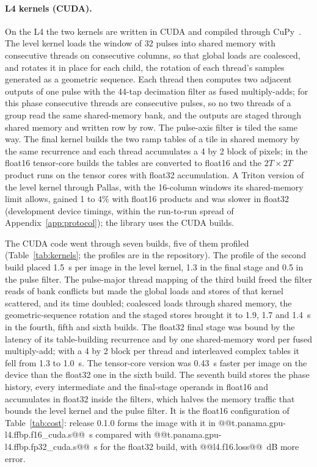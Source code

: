 \documentclass[11pt]{article}
\begin{document}
\paragraph{L4 kernels (CUDA).} On the L4 the two kernels are written in CUDA and compiled through CuPy~\cite{okuta2017}. The level kernel loads the window of 32 pulses into shared memory with consecutive threads on consecutive columns, so that global loads are coalesced, and rotates it in place for each child, the rotation of each thread's samples generated as a geometric sequence. Each thread then computes two adjacent outputs of one pulse with the 44-tap decimation filter as fused multiply-adds; for this phase consecutive threads are consecutive pulses, so no two threads of a group read the same shared-memory bank, and the outputs are staged through shared memory and written row by row. The pulse-axis filter is tiled the same way. The final kernel builds the two ramp tables of a tile in shared memory by the same recurrence and each thread accumulates a 4 by 2 block of pixels; in the float16 tensor-core builds the tables are converted to float16 and the $2T \times 2T$ product runs on the tensor cores with float32 accumulation. A Triton version of the level kernel through Pallas, with the 16-column windows its shared-memory limit allows, gained 1 to 4\% with float16 products and was slower in float32 (development device timings, within the run-to-run spread of Appendix~\ref{app:protocol}); the library uses the CUDA builds.

The CUDA code went through seven builds, five of them profiled (Table~\ref{tab:kernels}; the profiles are in the repository). The profile of the second build placed 1.5~s per image in the level kernel, 1.3 in the final stage and 0.5 in the pulse filter. The pulse-major thread mapping of the third build freed the filter reads of bank conflicts but made the global loads and stores of that kernel scattered, and its time doubled; coalesced loads through shared memory, the geometric-sequence rotation and the staged stores brought it to 1.9, 1.7 and 1.4~s in the fourth, fifth and sixth builds. The float32 final stage was bound by the latency of its table-building recurrence and by one shared-memory word per fused multiply-add; with a 4 by 2 block per thread and interleaved complex tables it fell from 1.3 to 1.0~s. The tensor-core version was 0.43~s faster per image on the device than the float32 one in the sixth build. The seventh build stores the phase history, every intermediate and the final-stage operands in float16 and accumulates in float32 inside the filters, which halves the memory traffic that bounds the level kernel and the pulse filter. It is the float16 configuration of Table~\ref{tab:cost}: release 0.1.0 forms the image with it in @@t.panama.gpu-l4.ffbp.f16_cuda.s@@~s compared with @@t.panama.gpu-l4.ffbp.fp32_cuda.s@@~s for the float32 build, with @@l4.f16.loss@@~dB more error.
\end{document}
